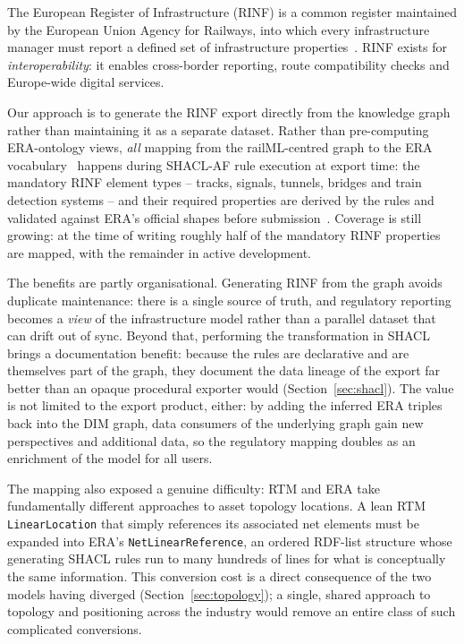 \documentclass{ceurart}
\begin{document}
The European Register of Infrastructure (RINF) is a common register maintained
by the European Union Agency for Railways, into which every infrastructure
manager must report a defined set of infrastructure
properties~\cite{rinf,rinf_reg}. RINF exists for \emph{interoperability}: it
enables cross-border reporting, route compatibility checks and Europe-wide
digital services.

Our approach is to generate the RINF export directly from the knowledge graph
rather than maintaining it as a separate dataset. Rather than pre-computing
ERA-ontology views, \emph{all} mapping from the railML-centred graph to the ERA
vocabulary~\cite{eraontology} happens during SHACL-AF rule execution at export
time: the mandatory RINF element types -- tracks, signals, tunnels, bridges and
train detection systems -- and their required properties are derived by the rules
and validated against ERA's official shapes before submission~\cite{dim}.
Coverage is still growing: at the time of writing roughly half of the mandatory
RINF properties are mapped, with the remainder in active development.

The benefits are partly organisational. Generating RINF from the graph avoids
duplicate maintenance: there is a single source of truth, and regulatory
reporting becomes a \emph{view} of the infrastructure model rather than a
parallel dataset that can drift out of sync. Beyond that, performing the
transformation in SHACL brings a documentation benefit: because the rules are
declarative and are themselves part of the graph, they document the data lineage
of the export far better than an opaque procedural exporter would
(Section~\ref{sec:shacl}). The value is not limited to the export product,
either: by adding the inferred ERA triples back into the DIM graph, data
consumers of the underlying graph gain new perspectives and additional data, so
the regulatory mapping doubles as an enrichment of the model for all users.

The mapping also exposed a genuine difficulty: RTM and ERA take fundamentally
different approaches to asset topology locations. A lean RTM
\texttt{LinearLocation} that simply references its associated net elements must
be expanded into ERA's \texttt{NetLinearReference}, an ordered RDF-list structure
whose generating SHACL rules run to many hundreds of lines for what is
conceptually the same information. This conversion cost is a direct consequence
of the two models having diverged (Section~\ref{sec:topology}); a single, shared
approach to topology and positioning across the industry would remove an entire
class of such complicated conversions.
\end{document}
